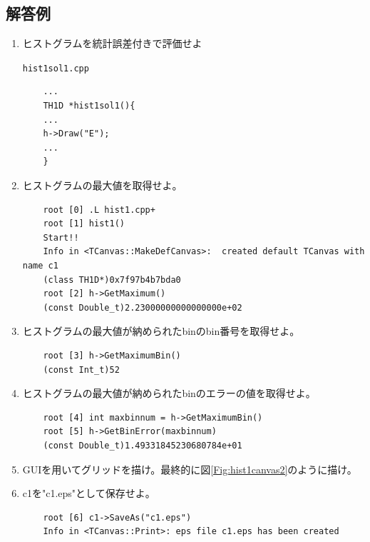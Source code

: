   \subsection{解答例}
  \begin{enumerate}
   \item ヒストグラムを統計誤差付きで評価せよ
	 \begin{itembox}{\texttt{hist1sol1.cpp}}
\begin{verbatim}
	...
	TH1D *hist1sol1(){
	...
	h->Draw("E");
	...
	}
\end{verbatim}
	 \end{itembox}

   \item ヒストグラムの最大値を取得せよ。
\begin{verbatim}
	root [0] .L hist1.cpp+
	root [1] hist1()
	Start!!
	Info in <TCanvas::MakeDefCanvas>:  created default TCanvas with name c1
	(class TH1D*)0x7f97b4b7bda0
	root [2] h->GetMaximum()
	(const Double_t)2.23000000000000000e+02
\end{verbatim}
   \item ヒストグラムの最大値が納められたbinのbin番号を取得せよ。
\begin{verbatim}
	root [3] h->GetMaximumBin()
	(const Int_t)52
\end{verbatim}
   \item ヒストグラムの最大値が納められたbinのエラーの値を取得せよ。
\begin{verbatim}
	root [4] int maxbinnum = h->GetMaximumBin()
	root [5] h->GetBinError(maxbinnum)
	(const Double_t)1.49331845230680784e+01
\end{verbatim}
   \item GUIを用いてグリッドを描け。最終的に図\ref{Fig:hist1canvas2}のように描け。

   \item c1を"c1.eps"として保存せよ。
\begin{verbatim}
	root [6] c1->SaveAs("c1.eps")
	Info in <TCanvas::Print>: eps file c1.eps has been created
\end{verbatim}
  \end{enumerate}
